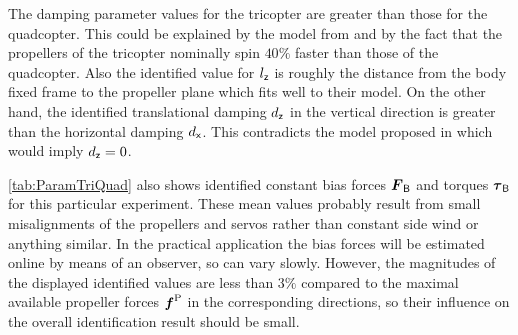 The damping parameter values for the tricopter are greater than those for the quadcopter.
This could be explained by the model from \cite{Martin:AccelerometerFeedback} and by the fact that the propellers of the tricopter nominally spin $40\%$ faster than those of the quadcopter.
Also the identified value for $l_{\mathsf{z}}$ is roughly the distance from the body fixed frame to the propeller plane which fits well to their model.
On the other hand, the identified translational damping $d_{\mathsf{z}}$ in the vertical direction is greater than the horizontal damping $d_{\mathsf{x}}$.
This contradicts the model proposed in \cite{Martin:AccelerometerFeedback} which would imply $d_{\mathsf{z}} = 0$.

\autoref{tab:ParamTriQuad} also shows identified constant bias forces $\boldsymbol{F}_{\mathsf{B}}$ and torques $\boldsymbol{\tau}_{\mathsf{B}}$ for this particular experiment.
These mean values probably result from small misalignments of the propellers and servos rather than constant side wind or anything similar.
In the practical application the bias forces will be estimated online by means of an observer, so can vary slowly.
However, the magnitudes of the displayed identified values are less than $3\%$ compared to the maximal available propeller forces $\boldsymbol{f}^{\mathrm{P}}$ in the corresponding directions, so their influence on the overall identification result should be small.



% 


